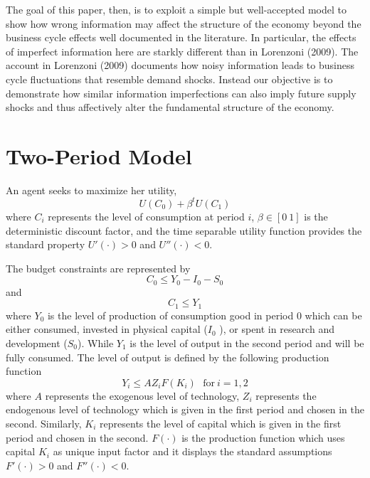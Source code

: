 \documentclass{article}
\begin{document}
	The goal of this paper, then, is to exploit a simple but well-accepted model to show how wrong information may affect the structure of the economy beyond the business cycle effects well documented in the literature. In particular, the effects of imperfect information here are starkly different than in Lorenzoni (2009). The account in Lorenzoni (2009) documents how noisy information leads to business cycle fluctuations that resemble demand shocks. Instead our objective is to demonstrate how similar information imperfections can also imply future supply shocks and thus affectively alter the fundamental structure of the economy.
	
	\section{Two-Period Model}
	
	An agent seeks to maximize her utility,
	\begin{equation}
	U(C_0) + \beta^t U(C_1)
	\end{equation}
	where $C_i$ represents the level of consumption at period $i$, $\beta \in [0 \ 1]$ is the deterministic discount factor, and the time separable utility function provides the standard property $U'(\cdot)>0$ and  $U''(\cdot) < 0$. 
	
	The budget constraints are represented by
	\begin{equation}
	C_0 \leq Y_0 - I_0 - S_0
	\end{equation}
	and
	\begin{equation}
	C_1 \leq Y_1
	\end{equation}
	where $Y_0$ is the level of production of consumption good in period $0$ which can be either consumed, invested in physical capital ($I_0$ ), or spent in research and development ($S_0$). While $Y_1$ is the level of output in the second period and will be fully consumed. The level of output is defined by the following production function
	\begin{equation}
	Y_i \leq A Z_i F(K_i) \ \ \ \text{for} \ i = 1,2
	\end{equation}
	where $A$ represents the exogenous level of technology, $Z_i$ represents the endogenous level of technology which is given in the first period and chosen in the second. Similarly, $K_i$ represents the level of capital which is given in the first period and chosen in the second. $F(\cdot)$ is the production function which uses capital $K_i$ as unique input factor and it displays the standard assumptions $F'(\cdot) > 0$ and $F''(\cdot) < 0$.
	
\end{document}
